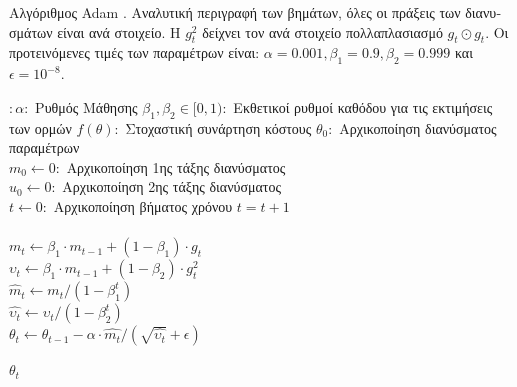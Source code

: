\begin{algorithm}[H]
    \caption[\textgreek{Αλγόριθμος }Adam]{\textgreek{Αλγόριθμος} Adam \cite{DBLP:journals/corr/KingmaB14}. \textgreek{Αναλυτική περιγραφή των βημάτων, όλες οι πράξεις των διανυσμάτων είναι ανά στοιχείο. Η $g_{t}^{2}$ δείχνει τον ανά στοιχείο πολλαπλασιασμό $g_{t}\odot g_{t}$. Οι προτεινόμενες τιμές των παραμέτρων είναι: $\alpha = 0.001, \beta_{1}=0.9, \beta_{2}=0.999$ και $\epsilon=10^{-8}$}.}\label{alg:Algo_adam}
  \begin{algorithmic}[1]
    \REQUIRE $:\alpha:$ \textgreek{Ρυθμός Μάθησης} 
    \REQUIRE $\beta_{1},\beta_2 \in [0,1):$ \textgreek{Εκθετικοί ρυθμοί καθόδου για τις εκτιμήσεις των ορμών}
    \REQUIRE $f(\theta):$ \textgreek{Στοχαστική συνάρτηση κόστους}
    \REQUIRE $\theta_{0}:$ \textgreek{Αρχικοποίηση διανύσματος παραμέτρων}\\
    $m_{0} \gets 0:$ \textgreek{Αρχικοποίηση 1ης τάξης διανύσματος} \\
    $u_{0} \gets 0:$ \textgreek{Αρχικοποίηση 2ης τάξης διανύσματος} \\ 
    $t \gets 0:$ \textgreek{Αρχικοποίηση βήματος χρόνου}
     \STATE $t = t + 1$\\
     
      \\
     
     \STATE $m_{t} \gets \beta_{1} \cdot m_{t-1} + (1 - \beta_{1}) \cdot g_{t}$ \\
     
     \STATE $\upsilon_{t} \gets \beta_{1} \cdot m_{t-1} + (1 - \beta_{2}) \cdot g_{t}^{2}$ \\
     \STATE $\hat{m}_{t} \gets m_{t}/(1 - \beta_{1}^{t})$ \\
     
     \STATE $\hat{\upsilon_{t}} \gets \upsilon_{t}/(1 - \beta_{2}^{t})$  \\
     
     \STATE $\theta_{t} \gets \theta_{t-1} - \alpha \cdot \hat{m_{t}}/(\sqrt{\hat{\upsilon_{t}}} + \epsilon) $ 
           
    \ENDWHILE
    \RETURN $\theta_{t}$ 

  \end{algorithmic}
\end{algorithm}



